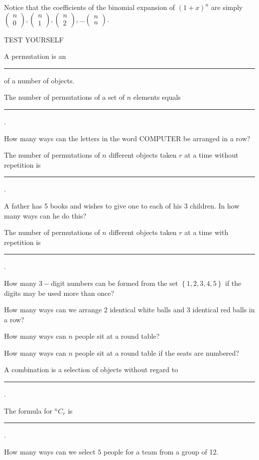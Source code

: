 \documentclass[11pt,a4paper]{book}
\begin{document}
Notice that the coefficients of the binomial expansion of $\left(1+x\right)^{n}$
are simply $\begin{pmatrix}n\\
0
\end{pmatrix},\begin{pmatrix}n\\
1
\end{pmatrix},\begin{pmatrix}n\\
2
\end{pmatrix},\ldots\begin{pmatrix}n\\
n
\end{pmatrix}$.

\newpage

\begin{testyourself}{TEST YOURSELF}
\begin{tasks}[label=(\alph*),label-width=3.5ex]

\task  A permutation is an \rule{4cm}{0.5pt} of a number of objects.

\task  The number of permutations of a set of $n$ elements equals
\rule{2cm}{0.5pt}.

\task  How many ways can the letters in the word COMPUTER be arranged
in a row?

\task  The number of permutations of $n$ different objects taken
$r$ at a time without repetition\textbf{ }is \rule{2cm}{0.5pt}.

\task  A father has 5 books and wishes to give one to each of his
3 children. In how many ways can he do this?

\task  The number of permutations of $n$ different objects taken
$r$ at a time with repetition\textbf{ }is \rule{2cm}{0.5pt}.

\task  How many $3-$digit numbers can be formed from the set $\left\{ 1,2,3,4,5\right\} $
if the digits may be used more than once?

\task  How many ways can we arrange 2 identical white balls and 3
identical red balls in a row?

\task  How many ways can $n$ people sit at a round table?

\task  How many ways can $n$ people sit at a round table if the
seats are numbered?

\task  A combination is a selection of objects without regard to
\rule{4cm}{0.5pt}.

\task  The formula for $^{n}C_{r}$ is \rule{2cm}{0.5pt}.

\task How many ways can we select $5$ people for a team from a group
of 12.

\end{tasks}
\end{testyourself}
\end{document}
